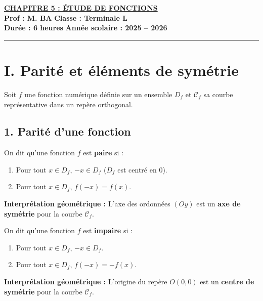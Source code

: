 \documentclass[12pt,a4paper]{article}
\begin{document}
\begin{center}
    \Large\textbf{\underline{\textcolor{myred}{CHAPITRE 5 : ÉTUDE DE FONCTIONS}}}\\[0.2cm]
    \normalsize\textbf{Prof : M. BA} \hfill \textbf{Classe : Terminale L}\\[0.1cm]
    \textbf{Durée : 6 heures} \hfill \textbf{Année scolaire : 2025 -- 2026}
\end{center}
\hrule
\vspace{0.3cm}



\section*{\color{myred}I. Parité et éléments de symétrie}

Soit $f$ une fonction numérique définie sur un ensemble $D_f$ et $\mathcal{C}_f$ sa courbe représentative dans un repère orthogonal.

\subsection*{\color{myred}1. Parité d'une fonction}

\begin{tcolorbox}[colback=blue!5!white,colframe=myblue,title=\textbf{Définition 1 : Fonction paire}]
On dit qu'une fonction $f$ est \textbf{paire} si :
\begin{enumerate}
    \item Pour tout $x \in D_f$, $-x \in D_f$ ($D_f$ est centré en $0$).
    \item Pour tout $x \in D_f$, $f(-x) = f(x)$.
\end{enumerate}
\textbf{Interprétation géométrique :} L'axe des ordonnées $(Oy)$ est un \textbf{axe de symétrie} pour la courbe $\mathcal{C}_f$.
\end{tcolorbox}

\begin{tcolorbox}[colback=red!5!white,colframe=myred,title=\textbf{Définition 2 : Fonction impaire}]
On dit qu'une fonction $f$ est \textbf{impaire} si :
\begin{enumerate}
    \item Pour tout $x \in D_f$, $-x \in D_f$.
    \item Pour tout $x \in D_f$, $f(-x) = -f(x)$.
\end{enumerate}
\textbf{Interprétation géométrique :} L'origine du repère $O(0,0)$ est un \textbf{centre de symétrie} pour la courbe $\mathcal{C}_f$.
\end{tcolorbox}
\end{document}
